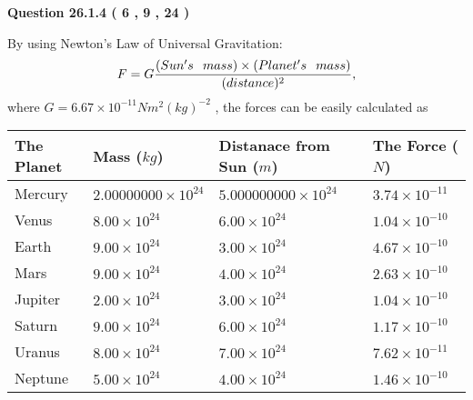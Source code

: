 \documentclass[12pt]{article}
\begin{document}
  
\vspace{0.2in}
  
{\textbf{\Large{Question
26.1.4 
 (           6 ,           9 ,          24 )
}}}
  
  
 
 
\noindent{}

By using Newton's Law of Universal Gravitation:
\[
F=G \frac{(Sun's \hspace{0.1in} mass) \times (Planet's \hspace{0.1in} mass)} { (distance)^2},
\]
where
$ G= %
6.67 \times 10^{-11}N m^{2}(kg)^{-2}$ , the forces can be easily calculated as
 
\vspace{0.2in}
 
 
\begin{tabular}{|l|l|l|l|}
\hline
The Planet & Mass ($kg$) & Distanace from Sun ($m$) & The Force ($N$)\\
\hline
Mercury  &
           $ %
2.00000000 \times 10^{24} $   &
             $ %
5.000000000 \times 10^{24} $    & $ %
3.74 \times 10^{-11} $
\\  \hline
Venus    &
           $  %
8.00 \times 10^{24}  $     &
             $ %
6.00 \times 10^{24} $    & $ %
1.04 \times 10^{-10} $
\\  \hline
Earth    &
           $  %
9.00 \times 10^{24}  $     &
             $ %
3.00 \times 10^{24} $    & $ %
4.67 \times 10^{-10} $
\\   \hline
Mars     &
           $  %
9.00 \times 10^{24} $     &
             $ %
4.00 \times 10^{24} $    & $ %
2.63 \times 10^{-10} $
\\   \hline
Jupiter  &
           $  %
2.00 \times 10^{24} $    &
             $ %
3.00 \times 10^{24} $    & $ %
1.04 \times 10^{-10} $
\\  \hline
Saturn   &
           $  %
9.00 \times 10^{24} $    &
             $ %
6.00 \times 10^{24}  $    & $ %
1.17 \times 10^{-10} $
\\  \hline
Uranus   &
           $  %
8.00 \times 10^{24} $    &
             $ %
7.00 \times 10^{24} $    & $ %
7.62 \times 10^{-11} $
\\  \hline
Neptune  &
           $  %
5.00 \times 10^{24} $    &
             $ %
4.00 \times 10^{24} $    & $ %
1.46 \times 10^{-10} $
\\  \hline
 
\end{tabular}
 
\end{document}
